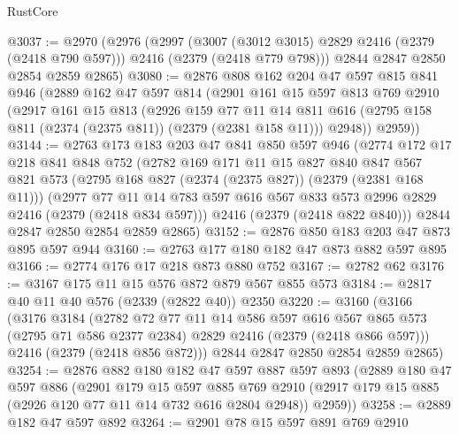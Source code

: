 \begin{lexlean}{RustCore}
\begin{coremodule}
@3037 := @2970
    (@2976
      (@2997
        (@3007 (@3012 @3015) @2829 @2416 (@2379 (@2418 @790 @597)))
        @2416
        (@2379 (@2418 @779 @798)))
      @2844
      @2847
      @2850
      @2854
      @2859
      @2865)
@3080 := @2876
    @808
    @162
    @204
    @47
    @597
    @815
    @841
    @946
    (@2889
      @162
      @47
      @597
      @814
      (@2901
        @161
        @15
        @597
        @813
        @769
        @2910
        (@2917
          @161
          @15
          @813
          (@2926
            @159
            @77
            @11
            @14
            @811
            @616
            (@2795 @158 @811 (@2374 (@2375 @811)) (@2379 (@2381 @158 @11)))
            @2948))
        @2959))
@3144 := @2763
    @173
    @183
    @203
    @47
    @841
    @850
    @597
    @946
    (@2774
      @172
      @17
      @218
      @841
      @848
      @752
      (@2782
        @169
        @171
        @11
        @15
        @827
        @840
        @847
        @567
        @821
        @573
        (@2795 @168 @827 (@2374 (@2375 @827)) (@2379 (@2381 @168 @11)))
        (@2977
          @77
          @11
          @14
          @783
          @597
          @616
          @567
          @833
          @573
          @2996
          @2829
          @2416
          (@2379 (@2418 @834 @597)))
        @2416
        (@2379 (@2418 @822 @840)))
      @2844
      @2847
      @2850
      @2854
      @2859
      @2865)
@3152 := @2876 @850 @183 @203 @47 @873 @895 @597 @944
@3160 := @2763 @177 @180 @182 @47 @873 @882 @597 @895
@3166 := @2774 @176 @17 @218 @873 @880 @752
@3167 := @2782 @62
@3176 := @3167 @175 @11 @15 @576 @872 @879 @567 @855 @573
@3184 := @2817 @40 @11 @40 @576 (@2339 (@2822 @40)) @2350
@3220 := @3160
    (@3166
      (@3176
        @3184
        (@2782
          @72
          @77
          @11
          @14
          @586
          @597
          @616
          @567
          @865
          @573
          (@2795 @71 @586 @2377 @2384)
          @2829
          @2416
          (@2379 (@2418 @866 @597)))
        @2416
        (@2379 (@2418 @856 @872)))
      @2844
      @2847
      @2850
      @2854
      @2859
      @2865)
@3254 := @2876
    @882
    @180
    @182
    @47
    @597
    @887
    @597
    @893
    (@2889
      @180
      @47
      @597
      @886
      (@2901
        @179
        @15
        @597
        @885
        @769
        @2910
        (@2917 @179 @15 @885 (@2926 @120 @77 @11 @14 @732 @616 @2804 @2948))
        @2959))
@3258 := @2889 @182 @47 @597 @892
@3264 := @2901 @78 @15 @597 @891 @769 @2910

\end{coremodule}
\end{lexlean}
